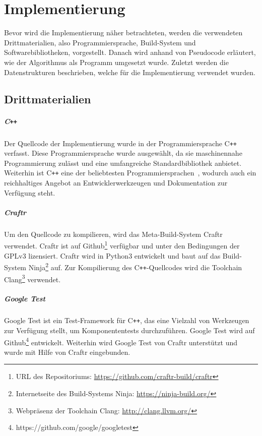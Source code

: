 \newcommand{\Cpp}{C{}\texttt{++}}

\chapter{Implementierung}\label{chapter:implementierung}
Bevor wird die Implementierung näher betrachteten, werden die verwendeten Drittmaterialien, also Programmiersprache, Build-System und Softwarebibliotheken, vorgestellt.
Danach wird anhand von Pseudocode erläutert, wie der Algorithmus als Programm umgesetzt wurde. 
Zuletzt werden die Datenstrukturen beschrieben, welche für die Implementierung verwendet wurden.

\section{Drittmaterialien}

\paragraph{\Cpp}
Der Quellcode der Implementierung wurde in der Programmiersprache \Cpp{} verfasst.
Diese Programmiersprache wurde ausgewählt, da sie maschinennahe Programmierung zulässt und eine umfangreiche Standardbibliothek anbietet.
Weiterhin ist \Cpp{} eine der beliebtesten Programmiersprachen~\parencite{TIO17}, wodurch auch ein reichhaltiges Angebot an Entwicklerwerkzeugen und Dokumentation zur Verfügung steht.

\paragraph{Craftr}
Um den Quellcode zu kompilieren, wird das Meta-Build-System Craftr verwendet.
Craftr ist auf Github\footnote{URL des Repositoriums: \url{https://github.com/craftr-build/craftr}} verfügbar und unter den Bedingungen der GPLv3 lizensiert.
Craftr wird in Python3 entwickelt und baut auf das Build-System Ninja\footnote{Internetseite des Build-Systems Ninja: \url{https://ninja-build.org/}} auf. 
Zur Kompilierung des \Cpp\hyp Quellcodes wird die Toolchain Clang\footnote{Webpräsenz der Toolchain Clang: \url{http://clang.llvm.org/}} verwendet.

\paragraph{Google Test}
Google Test ist ein Test-Framework für \Cpp, das eine Vielzahl von Werkzeugen zur Verfügung stellt, um Komponententests durchzuführen. 
Google Test wird auf Github\footnote{https://github.com/google/googletest} entwickelt.
Weiterhin wird Google Test von Craftr unterstützt und wurde mit Hilfe von Craftr eingebunden.


